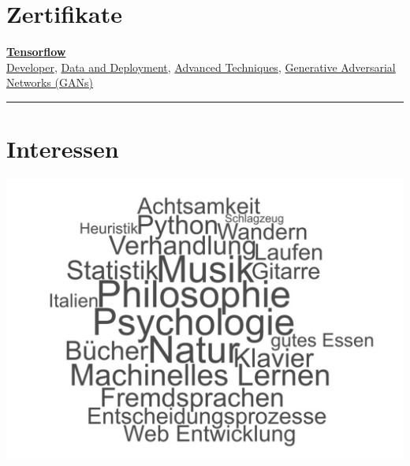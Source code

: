\documentclass{article}
\begin{document}
\begin{minipage}[t]{0.25\textwidth}
	\section*{\fontsize{18pt}{24pt}\selectfont \color{pblue} Zertifikate}
	\centering
	\vspace{-2mm}
	\textbf{\color{pblue}\underline{Tensorflow}}\\
	\href{https://www.coursera.org/account/accomplishments/specialization/certificate/WNXPGV8FR3AF}{\color{pblue}Developer},
	\href{https://www.coursera.org/account/accomplishments/specialization/certificate/R4LSQ7AK8M83}{\color{pblue}Data and Deployment},
	\href{https://www.coursera.org/account/accomplishments/specialization/certificate/5DDY3GKK3YTV}{\color{pblue}Advanced Techniques},
	\href{https://www.coursera.org/account/accomplishments/specialization/certificate/KA3YGBWN8RM2}{\color{pblue}Generative Adversarial Networks (GANs)}\\
	\vspace{2mm}
	\hrule
	\vspace{-2mm}
	\centering
	\section*{\fontsize{18pt}{24pt}\selectfont \color{pblue} Interessen}
	\vspace{-2mm}
	\vfill
	\includegraphics[trim=3cm 1cm 2cm 1cm, clip,scale=0.165]{../../img/wordcloudGER.pdf}

\end{minipage}
\end{document}
